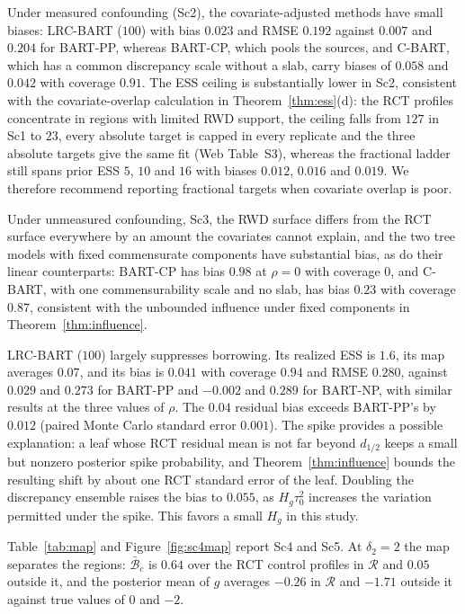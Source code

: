 Under measured confounding (Sc2), the covariate-adjusted methods have small biases: LRC-BART ($100$) with bias $0.023$ and RMSE $0.192$ against $0.007$ and $0.204$ for BART-PP, whereas BART-CP, which pools the sources, and C-BART, which has a common discrepancy scale without a slab, carry biases of $0.058$ and $0.042$ with coverage $0.91$. The ESS ceiling is substantially lower in Sc2, consistent with the covariate-overlap calculation in Theorem~\ref{thm:ess}(d): the RCT profiles concentrate in regions with limited RWD support, the ceiling falls from $127$ in Sc1 to $23$, every absolute target is capped in every replicate and the three absolute targets give the same fit (Web Table~S3), whereas the fractional ladder still spans prior ESS $5$, $10$ and $16$ with biases $0.012$, $0.016$ and $0.019$. We therefore recommend reporting fractional targets when covariate overlap is poor.

Under unmeasured confounding, Sc3, the RWD surface differs from the RCT surface everywhere by an amount the covariates cannot explain, and the two tree models with fixed commensurate components have substantial bias, as do their linear counterparts: BART-CP has bias $0.98$ at $\rho=0$ with coverage $0$, and C-BART, with one commensurability scale and no slab, has bias $0.23$ with coverage $0.87$, consistent with the unbounded influence under fixed components in Theorem~\ref{thm:influence}.

LRC-BART ($100$) largely suppresses borrowing. Its realized ESS is $1.6$, its map averages $0.07$, and its bias is $0.041$ with coverage $0.94$ and RMSE $0.280$, against $0.029$ and $0.273$ for BART-PP and $-0.002$ and $0.289$ for BART-NP, with similar results at the three values of $\rho$. The $0.04$ residual bias exceeds BART-PP's by $0.012$ (paired Monte Carlo standard error $0.001$). The spike provides a possible explanation: a leaf whose RCT residual mean is not far beyond $d_{1/2}$ keeps a small but nonzero posterior spike probability, and Theorem~\ref{thm:influence} bounds the resulting shift by about one RCT standard error of the leaf. Doubling the discrepancy ensemble raises the bias to $0.055$, as $H_g\tau_0^2$ increases the variation permitted under the spike. This favors a small $H_g$ in this study.

Table~\ref{tab:map} and Figure~\ref{fig:sc4map} report Sc4 and Sc5. At $\delta_2=2$ the map separates the regions: $\bar{\mathcal B}_c$ is $0.64$ over the RCT control profiles in $\mathcal R$ and $0.05$ outside it, and the posterior mean of $g$ averages $-0.26$ in $\mathcal R$ and $-1.71$ outside it against true values of $0$ and $-2$.

